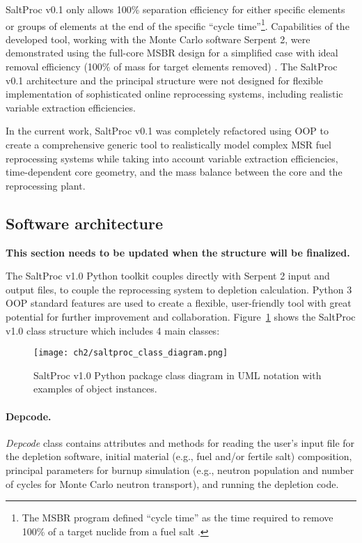 SaltProc v0.1 only allows 100\% separation efficiency for either specific 
elements or groups of elements at the end of the specific ``cycle 
time''\footnote{The \gls{MSBR} program defined ``cycle time'' as the time 
required to remove 100\% of a target nuclide from a fuel salt  
\cite{robertson_conceptual_1971}.}. Capabilities of the developed tool, 
working with the Monte Carlo software Serpent 2, were demonstrated using the 
full-core MSBR design for a simplified case with ideal removal efficiency 
(100\% of mass for target elements removed) \cite{rykhlevskii_modeling_2019}. 
The SaltProc v0.1 architecture and the principal structure were not designed 
for flexible implementation of sophisticated online reprocessing systems, 
including realistic variable extraction efficiencies. 

In the current work, SaltProc v0.1 was completely refactored using \gls{OOP} 
to create a comprehensive generic tool to realistically model complex 
\gls{MSR} fuel reprocessing systems while taking into account variable 
extraction efficiencies, time-dependent core geometry, and the mass balance 
between the core and the reprocessing plant.

\subsection{Software architecture} \textbf{This section needs to be updated 
when the structure will be finalized.}

The SaltProc v1.0 Python toolkit couples directly with Serpent 2 input 
and output files, to couple the reprocessing system to depletion calculation. 
Python 3 \gls{OOP} standard features are used to create a flexible, 
user-friendly tool with great potential for further improvement and 
collaboration. Figure~\ref{fig:saltproc_class} shows the SaltProc v1.0 class 
structure which includes 4 main classes:
\begin{figure}[ht!] %
	\texttt{[image: ch2/saltproc\_class\_diagram.png]}
	\vspace{-0.15in}
	\caption{SaltProc v1.0 Python package class diagram in UML 
	notation with examples of object instances.}
	\label{fig:saltproc_class}
\end{figure}
\paragraph*{Depcode.}\textit{Depcode} class contains attributes and methods 
for reading the user's input file for the depletion software, initial material 
(e.g., fuel and/or fertile salt) composition, principal parameters for burnup 
simulation (e.g., neutron population and number of cycles for Monte Carlo 
neutron transport), and running the depletion code.
